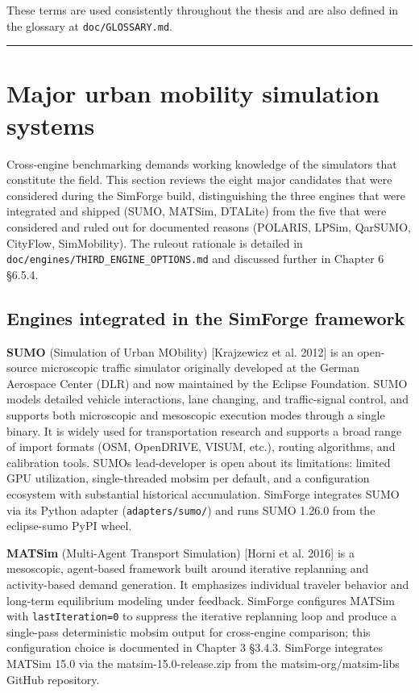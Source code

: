 These terms are used consistently throughout the thesis and are also
defined in the glossary at \texttt{doc/GLOSSARY.md}.

\begin{center}\rule{0.5\linewidth}{0.5pt}\end{center}

\section{Major urban mobility simulation
systems}\label{23-major-urban-mobility-simulation-systems}

Cross-engine benchmarking demands working knowledge of the simulators
that constitute the field. This section reviews the eight major
candidates that were considered during the SimForge build,
distinguishing the three engines that were integrated and shipped (SUMO,
MATSim, DTALite) from the five that were considered and ruled out for
documented reasons (POLARIS, LPSim, QarSUMO, CityFlow, SimMobility). The
ruleout rationale is detailed in
\texttt{doc/engines/THIRD\_ENGINE\_OPTIONS.md} and discussed further in
Chapter 6 §6.5.4.

\subsection{Engines integrated in the SimForge
framework}\label{231-engines-integrated-in-the-simforge-framework}

\textbf{SUMO} (Simulation of Urban MObility) {[}Krajzewicz et al.
2012{]} is an open-source microscopic traffic simulator originally
developed at the German Aerospace Center (DLR) and now maintained by the
Eclipse Foundation. SUMO models detailed vehicle interactions, lane
changing, and traffic-signal control, and supports both microscopic and
mesoscopic execution modes through a single binary. It is widely used
for transportation research and supports a broad range of import formats
(OSM, OpenDRIVE, VISUM, etc.), routing algorithms, and calibration
tools. SUMO\textquotesingle s lead-developer is open about its
limitations: limited GPU utilization, single-threaded mobsim per
default, and a configuration ecosystem with substantial historical
accumulation. SimForge integrates SUMO via its Python adapter
(\texttt{adapters/sumo/}) and runs SUMO 1.26.0 from the eclipse-sumo
PyPI wheel.

\textbf{MATSim} (Multi-Agent Transport Simulation) {[}Horni et al.
2016{]} is a mesoscopic, agent-based framework built around iterative
replanning and activity-based demand generation. It emphasizes
individual traveler behavior and long-term equilibrium modeling under
feedback. SimForge configures MATSim with \texttt{lastIteration=0} to
suppress the iterative replanning loop and produce a single-pass
deterministic mobsim output for cross-engine comparison; this
configuration choice is documented in Chapter 3 §3.4.3. SimForge
integrates MATSim 15.0 via the matsim-15.0-release.zip from the
matsim-org/matsim-libs GitHub repository.

